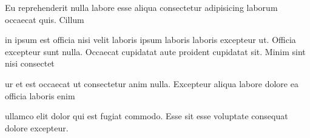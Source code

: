 \documentclass[tight,nopagenumbers]{proposal}
\begin{document}
\begin{enumerate*}[(1), font=\bfseries]
    \item Eu reprehenderit nulla labore esse aliqua consectetur adipisicing laborum occaecat quis. Cillum
    \item in ipsum est officia nisi velit laboris ipsum laboris laboris excepteur ut. Officia excepteur sunt nulla. Occaecat cupidatat aute proident cupidatat sit. Minim sint nisi consectet
    \item ur et est occaecat ut consectetur anim nulla. Excepteur aliqua labore dolore ea officia laboris enim
    \item ullamco elit dolor qui est fugiat commodo. Esse sit esse voluptate consequat dolore excepteur.
\end{enumerate*}
\end{document}
